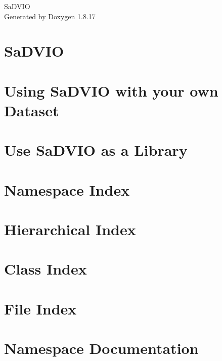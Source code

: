 \let\mypdfximage\pdfximage\def\pdfximage{\immediate\mypdfximage}\documentclass[twoside]{book}
\newcommand{\+}{\discretionary{\mbox{\scriptsize$\hookleftarrow$}}{}{}}
\newcommand{\clearemptydoublepage}{%
  \newpage{\pagestyle{empty}\cleardoublepage}%
}
\begin{document}
\hypersetup{pageanchor=false,
             bookmarksnumbered=true,
             pdfencoding=unicode
            }
\begin{titlepage}
\vspace*{7cm}
\begin{center}%
{\Large Sa\+D\+V\+IO }\\
\vspace*{1cm}
{\large Generated by Doxygen 1.8.17}\\
\end{center}
\end{titlepage}
\clearemptydoublepage
{}
\tableofcontents
\clearemptydoublepage
{}
\hypersetup{pageanchor=true}

\chapter{Sa\+D\+V\+IO}
\label{index}\hypertarget{index}{}
\chapter{Using Sa\+D\+V\+IO with your own Dataset}
\label{md__t_u_t_o}

\chapter{Use Sa\+D\+V\+IO as a Library}
\label{md__t_u_t_o_l_i_b}

\chapter{Namespace Index}

\chapter{Hierarchical Index}

\chapter{Class Index}

\chapter{File Index}

\chapter{Namespace Documentation}





\end{document}
